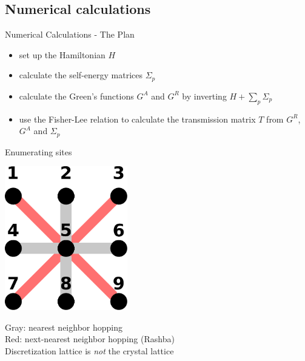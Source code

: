 \documentclass{beamer}
\begin{document}
\subsection{Numerical calculations}
\begin{frame}{Numerical Calculations - The Plan}
    \begin{center}
    \begin{itemize}
        \item set up the Hamiltonian $H$
        \item calculate the self-energy matrices $\Sigma_p$
        \item calculate the Green's functions $G^A$ and $G^R$ by inverting
            $H + \sum_p \Sigma_p$
        \item use the Fisher-Lee relation to calculate the transmission matrix $T$
                from $G^R$, $G^A$ and $\Sigma_p$
    \end{itemize}
    \end{center}
\end{frame}

\begin{frame}{Enumerating sites}
    \begin{multicols}{2}
        \includegraphics[width=0.4\textwidth]{hopping.pdf}
        \bf

        Gray: nearest neighbor hopping\\[1.5em]

        Red: next-nearest neighbor hopping (Rashba)\\[1.5em]

        Discretization lattice is \emph{not} the crystal lattice
    \end{multicols}
\end{frame}
\end{document}
